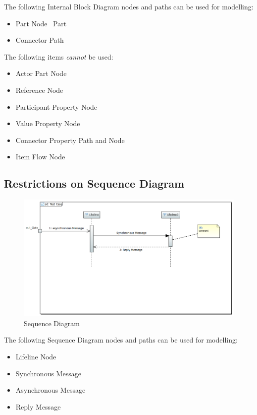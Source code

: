 The following Internal Block Diagram nodes and paths can be used for
modelling:
\begin{itemize}
\item Part Node ~\textsf{Part}
\item Connector Path
\end{itemize}

The following items \emph{cannot} be used:
\begin{itemize}
\item Actor Part Node
\item Reference Node
\item Participant Property Node
\item Value Property Node
\item Connector Property Path and Node
\item Item Flow Node
\end{itemize}

\subsection{Restrictions on Sequence Diagram}



\begin{figure}[ht]
  \centering
  \includegraphics[width=\textwidth]{images/SequenceDiagram.PNG}
  \caption{Sequence Diagram}
  \label{fig:sd}
\end{figure}


The following Sequence Diagram nodes and paths can be used for
modelling:
\begin{itemize}
\item Lifeline Node
\item Synchronous Message
\item Asynchronous Message
\item Reply Message
\end{itemize}

